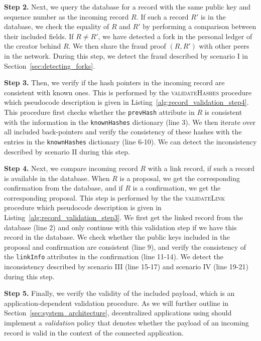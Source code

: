 \textbf{Step 2.}
Next, we query the database for a record with the same public key and sequence number as the incoming record $ R $.
If such a record $ R' $ is in the database, we check the equality of $ R $ and $ R' $ by performing a comparison between their included fields.
If $ R \not= R' $, we have detected a fork in the personal ledger of the creator behind $ R $.
We then share the fraud proof $ (R, R') $ with other peers in the network.
During this step, we detect the fraud described by scenario I in Section~\ref{sec:detecting_forks}.

\textbf{Step 3.}
Then, we verify if the hash pointers in the incoming record are consistent with known ones.
This is performed by the \textsc{validateHashes} procedure which pseudocode description is given in Listing~\ref{alg:record_validation_step4}.
This procedure first checks whether the \texttt{prevHash} attribute in $ R $ is consistent with the information in the \texttt{knownHashes} dictionary (line 3).
We then iterate over all included back-pointers and verify the consistency of these hashes with the entries in the \texttt{knownHashes} dictionary (line 6-10).
We can detect the inconsistency described by scenario II during this step.

\textbf{Step 4.}
Next, we compare incoming record $ R $ with a link record, if such a record is available in the database.
When $ R $ is a proposal, we get the corresponding confirmation from the database, and if $ R $ is a confirmation, we get the corresponding proposal.
This step is performed by the the \textsc{validateLink} procedure which pseudocode description is given in Listing~\ref{alg:record_validation_step3}.
We first get the linked record from the database (line 2) and only continue with this validation step if we have this record in the database.
We check whether the public keys included in the proposal and confirmation are consistent (line 9), and verify the consistency of the \texttt{linkInfo} attributes in the confirmation (line 11-14).
We detect the inconsistency described by scenario III (line 15-17) and scenario IV (line 19-21) during this step.

\textbf{Step 5.}
Finally, we verify the validity of the included payload, which is an application-dependent validation procedure.
As we will further outline in Section~\ref{sec:system_architecture}, decentralized applications using \TrustChain{} should implement a \emph{validation} policy that denotes whether the payload of an incoming record is valid in the context of the connected application.

